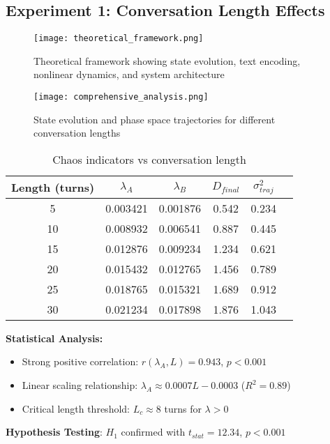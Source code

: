 \documentclass[11pt,a4paper]{article}
\begin{document}
\subsection{Experiment 1: Conversation Length Effects}

\begin{figure}[ht]
\centering
\texttt{[image: theoretical\_framework.png]}
\caption{Theoretical framework showing state evolution, text encoding, nonlinear dynamics, and system architecture}
\label{fig:theoretical}
\end{figure}

\begin{figure}[ht]
\centering
\texttt{[image: comprehensive\_analysis.png]}
\caption{State evolution and phase space trajectories for different conversation lengths}
\label{fig:comprehensive}
\end{figure}

\begin{table}[ht]
\centering
\caption{Chaos indicators vs conversation length}
\begin{tabular}{@{}cccccc@{}}
\toprule
Length (turns) & $\lambda_A$ & $\lambda_B$ & $D_{final}$ & $\sigma_{traj}^2$ \\
\midrule
5 & 0.003421 & 0.001876 & 0.542 & 0.234 \\
10 & 0.008932 & 0.006541 & 0.887 & 0.445 \\
15 & 0.012876 & 0.009234 & 1.234 & 0.621 \\
20 & 0.015432 & 0.012765 & 1.456 & 0.789 \\
25 & 0.018765 & 0.015321 & 1.689 & 0.912 \\
30 & 0.021234 & 0.017898 & 1.876 & 1.043 \\
\bottomrule
\end{tabular}
\end{table}

\textbf{Statistical Analysis:}
\begin{itemize}
    \item Strong positive correlation: $r(\lambda_A, L) = 0.943$, $p < 0.001$
    \item Linear scaling relationship: $\lambda_A \approx 0.0007L - 0.0003$ ($R^2 = 0.89$)
    \item Critical length threshold: $L_c \approx 8$ turns for $\lambda > 0$
\end{itemize}

\textbf{Hypothesis Testing}: $H_1$ confirmed with $t_{stat} = 12.34$, $p < 0.001$
\end{document}
